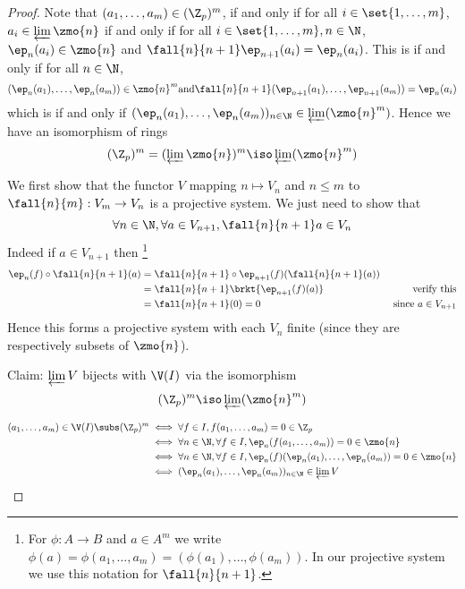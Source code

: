 \begin{proof}
    Note that $(a_1, \dots, a_m) \in (\Z_p)^m$, 
    if and only if for all $i \in \set{1, \dots, m}$,
    $a_i \in \varprojlim \zmo{n}$
    if and only if 
    for all $i \in \set{1, \dots, m}, n \in \N$,
    $\ep_n(a_i) \in \zmo{n}$ and $\fall{n}{n+1}\ep_{n+1}(a_i) = \ep_n(a_i)$.
    This is if and only if for all $n \in \N$,
    \[(\ep_n(a_1), \dots, \ep_n(a_m)) \in \zmo{n}^m
    \text{and} \fall{n}{n+1}(\ep_{n+1}(a_1), 
    \dots, \ep_{n+1}(a_m)) = \ep_n(a_i)\]
    which is if and only if 
    $(\ep_n(a_1), \dots, \ep_n(a_m))_{n \in \N} \in \varprojlim (\zmo{n}^m)$.
    Hence we have an isomorphism of rings 
    \[(\Z_p)^m = (\varprojlim{\zmo{n}})^m \iso \varprojlim (\zmo{n}^m)\]

    We first show that the functor $V$ mapping $n \mapsto V_n$ 
    and $n \le m$ to $\fall{n}{m} : V_m \to V_n$
    is a projective system.
    We just need to show that 
    \[\forall n \in \N, \forall a \in V_{n+1}, 
    \fall{n}{n+1} a \in V_n\]
    Indeed if $a \in V_{n+1}$ then \footnote{
        For $\phi: A \to B $ and $a \in A^m$ we write 
        $\phi(a) = \phi(a_1, \dots, a_m) = (\phi(a_1), \dots, \phi(a_m))$.
        In our projective system we use this notation for $\fall{n}{n+1}$.
    }
    \begin{align*}
        \ep_n (f) \circ \fall{n}{n+1}(a) 
        & = \fall{n}{n+1} \circ \ep_{n+1} 
        (f) (\fall{n}{n+1}(a))
        & \\
        &= \fall{n}{n+1} \brkt{\ep_{n+1} (f) (a)}
        & \text{ verify this}\\
        &= \fall{n}{n+1} (0) = 0 
        & \text{ since } a \in V_{n+1}
    \end{align*}
    Hence this forms a projective system with each $V_n$ 
    finite (since they are respectively subsets of $\zmo{n}$).
    
    Claim: $\varprojlim V$ bijects with $\V(I)$
    via the isomorphism 
    \[(\Z_p)^m \iso \varprojlim (\zmo{n}^m)\]

    \begin{align*}
        (a_1, \dots, a_m) \in \V(I) \subs (\Z_p)^m 
        &\iff \forall f \in I, f(a_1, \dots, a_m) = 0 \in \Z_p\\
        &\iff \forall n \in \N, \forall f \in I,  
        \ep_n(f(a_1, \dots, a_m)) = 0 \in \zmo{n}\\
        &\iff \forall n \in \N, \forall f \in I, 
        \ep_n(f)(\ep_n(a_1), \dots, \ep_n(a_m)) = 0 \in \zmo{n}\\
        &\iff (\ep_n(a_1), \dots, \ep_n(a_m))_{n \in \N} \in  
        \varprojlim V
    \end{align*}
\end{proof}

